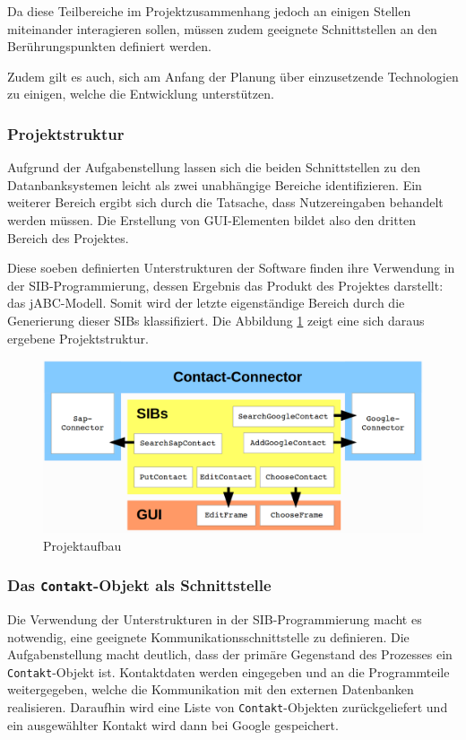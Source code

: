 Da diese Teilbereiche im Projektzusammenhang jedoch an einigen Stellen miteinander interagieren sollen, müssen
 zudem geeignete Schnittstellen an den Berührungspunkten definiert werden.
 
Zudem gilt es auch, sich am Anfang der Planung über einzusetzende Technologien zu einigen, welche die Entwicklung unterstützen.

\subsubsection{Projektstruktur}
Aufgrund der Aufgabenstellung lassen sich die beiden Schnittstellen zu den Datanbanksystemen leicht als zwei
 unabhängige Bereiche identifizieren.
Ein weiterer Bereich ergibt sich durch die Tatsache, dass Nutzereingaben behandelt werden müssen.
Die Erstellung von GUI-Elementen bildet also den dritten Bereich des Projektes.

Diese soeben definierten Unterstrukturen der Software finden ihre Verwendung in der SIB-Programmierung, dessen
 Ergebnis das Produkt des Projektes darstellt: das jABC-Modell.
Somit wird der letzte eigenständige Bereich durch die Generierung dieser SIBs klassifiziert.
Die Abbildung \ref{fig:projektaufbau} zeigt eine sich daraus ergebene Projektstruktur.

\begin{figure}[h!t]
\includegraphics[width=\textwidth]{Bilder/projekt_aufbau.png}
\caption{Projektaufbau}
\label{fig:projektaufbau}
\end{figure}
	
\subsubsection{Das \lstinline{Contakt}-Objekt als Schnittstelle}
Die Verwendung der Unterstrukturen in der SIB-Programmierung macht es notwendig, eine geeignete
 Kommunikationsschnittstelle zu definieren.
Die Aufgabenstellung macht deutlich, dass der primäre Gegenstand des Prozesses ein \lstinline{Contakt}-Objekt ist.
Kontaktdaten werden eingegeben und an die Programmteile weitergegeben, welche die Kommunikation mit den
 externen Datenbanken realisieren.
Daraufhin wird eine Liste von \lstinline{Contakt}-Objekten zurückgeliefert und ein ausgewählter Kontakt wird
 dann bei Google gespeichert.
 
